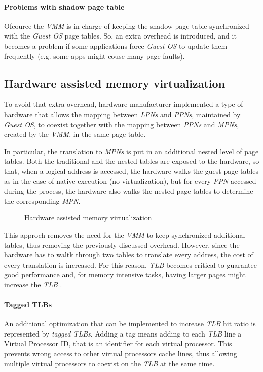 \paragraph{Problems with shadow page table}
Ofcource the \emph{VMM} is in charge of keeping the shadow page table
synchronized with the \emph{Guest OS} page tables. So, an extra overhead is
introduced, and it becomes a problem if some applications force \emph{Guest OS} to
update them frequently (e.g. some apps might couse many page faults).

\subsection{Hardware assisted memory virtualization}
To avoid that extra overhead, hardware manufacturer implemented a type of hardware
that allows the mapping between \emph{LPNs} and \emph{PPNs}, maintained by
\emph{Guest OS}, to coexist together with the mapping between \emph{PPNs} and
\emph{MPNs}, created by the \emph{VMM}, in the same page table.

In particular, the translation to \emph{MPNs} is put in an additional nested level
of page tables. Both the traditional and the nested tables are exposed to the
hardware, so that, when a logical address is accessed, the hardware walks the
guest page tables as in the case of native execution (no virtualization), but for
every \emph{PPN} accessed during the process, the hardware also walks the
nested page tables to determine the corresponding \emph{MPN}.

\begin{figure}[h!]
    \centering
    \caption{Hardware assisted memory virtualization}
\end{figure}

\noindent
This approch removes the need for the \emph{VMM} to keep synchronized additional
tables, thus removing the previously discussed overhead. However, since the
hardware has to waltk through two tables to translate every address, the cost of
every translation is increased. For this reason, \emph{TLB} becomes critical to
guarantee good performance and, for memory intensive tasks, having larger pages
might increase the \emph{TLB} .

\paragraph{Tagged TLBs}
An additional optimization that can be implemented to increase \emph{TLB} hit
ratio is represented by \emph{tagged TLBs}. Adding a tag means adding to each
\emph{TLB} line a Virtual Processor ID, that is an identifier for each virtual
processor. This prevents wrong access to other virtual processors cache lines,
thus allowing multiple virtual processors to coexist on the \emph{TLB} at the
same time.

